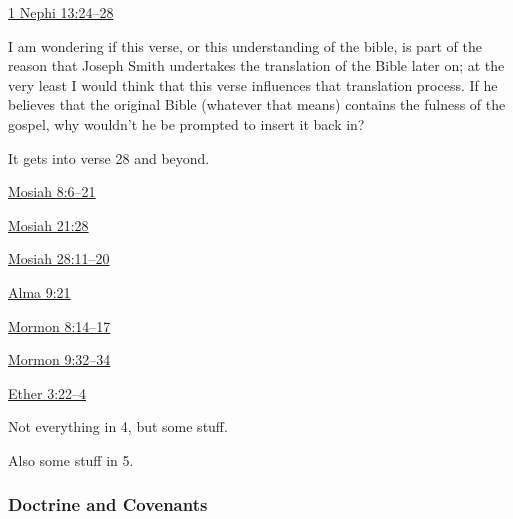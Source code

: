 		
		\begin{compactdesc}
			\item[{\hyperref[1NEPHI-13-24]{1 Nephi 13:24--28}}] \phantom{.}
				\begin{compactitem}
					\item I am wondering if this verse, or this understanding of the bible, is part of the reason that Joseph Smith undertakes the translation of the Bible later on; at the very least I would think that this verse influences that translation process. If he believes that the original Bible (whatever that means) contains the fulness of the gospel, why wouldn't he be prompted to insert it back in?
					\item It gets into verse 28 and beyond.
				\end{compactitem}
			\item[{\hyperref[MOSIAH-8-6]{Mosiah 8:6--21}}]
			\item[{\hyperref[MOSIAH-21-28]{Mosiah 21:28}}]
			\item[{\hyperref[MOSIAH-28-11]{Mosiah 28:11--20}}]
			\item[{\hyperref[ALMA-9-21]{Alma 9:21}}]
			\item[{\hyperref[MORMON-8-14]{Mormon 8:14--17}}]
			\item[{\hyperref[MORMON-9-32]{Mormon 9:32--34}}]
			\item[{\hyperref[ETHER-3-22]{Ether 3:22--4}}] \phantom{.}
				\begin{compactitem}
					\item Not everything in 4, but some stuff. 
					\item Also some stuff in 5.
				\end{compactitem}
		\end{compactdesc}
		
	\subsubsection{Doctrine and Covenants} %
		\label{TRANSLATION-DC}
	
		
